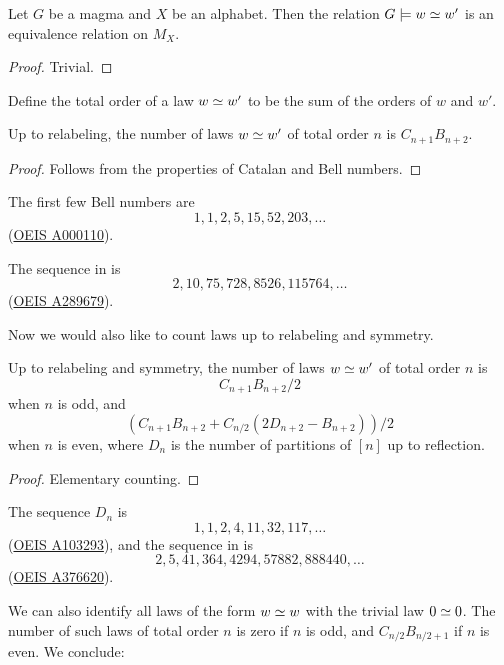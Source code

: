 \begin{lemma}[Equivalence]\label{equiv}
  Let $G$ be a magma and $X$ be an alphabet.
  Then the relation $G \models w \simeq w'$ is an equivalence relation on $M_X$.
\end{lemma}

\begin{proof}
  Trivial.
\end{proof}

Define the total order of a law $w \simeq w'$ to be the sum of the orders of $w$ and $w'$.

\begin{lemma}\label{law-count}
  Up to relabeling, the number of laws $w \simeq w'$ of total order $n$ is $C_{n+1} B_{n+2}$.
\end{lemma}

\begin{proof}
  Follows from the properties of Catalan and Bell numbers.
\end{proof}

The first few Bell numbers are
$$ 1, 1, 2, 5, 15, 52, 203, \dots$$
(\href{https://oeis.org/A000110}{OEIS A000110}).

The sequence in  is
$$ 2, 10, 75, 728, 8526, 115764, \dots$$
(\href{https://oeis.org/A289679}{OEIS A289679}).

Now we would also like to count laws up to relabeling and symmetry.

\begin{lemma}\label{law-count-sym}
  Up to relabeling and symmetry, the number of laws $w \simeq w'$ of total order $n$ is
  $$ C_{n+1} B_{n+2}/2$$
  when $n$ is odd, and
  $$ (C_{n+1} B_{n+2} + C_{n/2} (2D_{n+2} - B_{n+2}))/2$$
  when $n$ is even, where $D_n$ is the number of partitions of $[n]$ up to reflection.
\end{lemma}

\begin{proof}
  Elementary counting.
\end{proof}

The sequence $D_n$ is
$$ 1, 1, 2, 4, 11, 32, 117, \dots$$
(\href{https://oeis.org/A103293}{OEIS A103293}), and the sequence in  is
$$ 2, 5, 41, 364, 4294, 57882, 888440, \dots$$
(\href{https://oeis.org/A376620}{OEIS A376620}).

We can also identify all laws of the form $w \simeq w$ with the trivial law $0 \simeq 0$. The number of such laws of total order $n$ is zero if $n$ is odd, and $C_{n/2} B_{n/2+1}$ if $n$ is even. We conclude:

